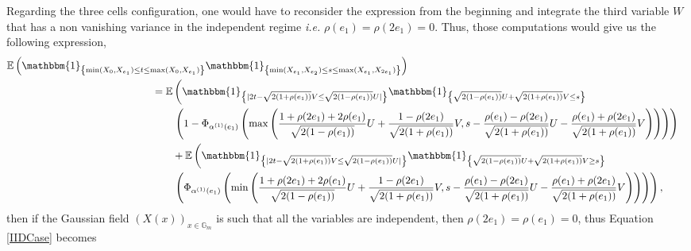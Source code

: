 \documentclass[12pt]{article}
\theoremstyle{Theorem}
\begin{document}
Regarding the three cells configuration, one would have to reconsider the expression from the beginning and integrate the third variable $W$ that has a non vanishing variance in the independent regime \textit{i.e.} $\rho(e_1) = \rho(2e_1)=0$. Thus, those computations would give us the following expression,
{\tiny
\begin{align}
\label{IIDCase}
\mathbb{E}\left(\mathbbm{1}_{\left\{\min(X_{\scriptscriptstyle 0}, X_{e_1}) \leq t \leq \max(X_{\scriptscriptstyle 0}, X_{e_1})\right\}}\mathbbm{1}_{\left\{\min(X_{e_1}, X_{e_2}) \leq s \leq \max(X_{e_1}, X_{2e_1}) \right\}}\right) \nonumber \\
& \hspace{-8.7cm} = \mathbb{E}\left(\mathbbm{1}_{\left\{|2t - \sqrt{2(1+\rho(e_1))}V \leq \sqrt{2(1-\rho(e_1))}U|\right\}}\mathbbm{1}_{\left\{\sqrt{2(1-\rho(e_1))}U + \sqrt{2(1+\rho(e_1))}V \leq s\right\}}\right. \nonumber \\
& \hspace{-8cm} \left. \left(1 - \Phi_{\alpha^{(1)}(e_1)}\left(\max\left(\frac{1 + \rho(2e_1) + 2\rho(e_1)}{\sqrt{2(1-\rho(e_1))}}U + \frac{1-\rho(2e_1)}{\sqrt{2(1+\rho(e_1))}}V, s - \frac{\rho(e_1) - \rho(2e_1)}{\sqrt{2(1+\rho(e_1))}} U - \frac{\rho(e_1) + \rho(2e_1)}{\sqrt{2(1+\rho(e_1))}}V \right) \right)\right)\right) \nonumber\\
& \hspace{-8cm} + \mathbb{E}\left(\mathbbm{1}_{\left\{|2t - \sqrt{2(1+\rho(e_1))}V \leq \sqrt{2(1-\rho(e_1))}U|\right\}}\mathbbm{1}_{\left\{\sqrt{2(1-\rho(e_1))}U+ \sqrt{2(1+\rho(e_1))}V \geq s\right\}}\right. \nonumber\\
& \hspace{-8cm} \left. \left(\Phi_{\alpha^{(1)}(e_1)}\left(\min\left(\frac{1 + \rho(2e_1) + 2\rho(e_1)}{\sqrt{2(1-\rho(e_1))}}U + \frac{1-\rho(2e_1)}{\sqrt{2(1+\rho(e_1))}}V, s - \frac{\rho(e_1) - \rho(2e_1)}{\sqrt{2(1+\rho(e_1))}} U - \frac{\rho(e_1) + \rho(2e_1)}{\sqrt{2(1+\rho(e_1))}}V \right) \right)\right)\right),
\end{align}}then if the Gaussian field $\left(X(x)\right)_{x \in \mathbb{G}_{m}}$ is such that all the variables are independent, then $\rho(2e_1) = \rho(e_1) = 0$, thus Equation \eqref{IIDCase} becomes 
\end{document}
